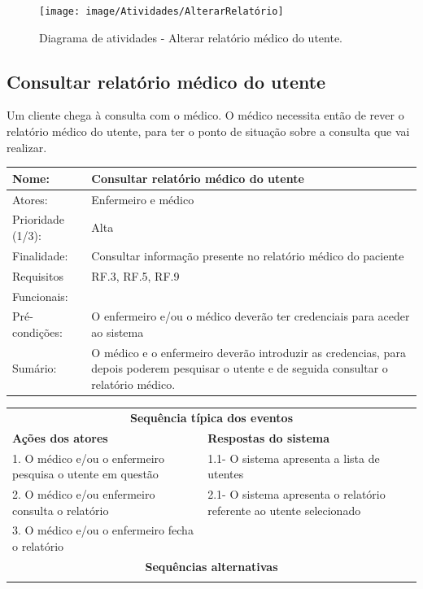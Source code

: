 \documentclass[11pt,a4paper,twoside]{report}
\begin{document}
\begin{figure}[H]
	\centering
	\texttt{[image: image/Atividades/AlterarRelatório]}
	\caption{Diagrama de atividades - Alterar relatório médico do utente.}
	\label{fig:alterarrelatoriomedico}
\end{figure}


\subsection{Consultar relatório médico do utente }

Um cliente chega à consulta com o médico. O médico necessita então de rever o relatório médico do utente, para ter o ponto de situação sobre a consulta que vai realizar.

\begin{center}
	\begin{tabularx}{\textwidth}{|lX|}
		\hline
		\textbf{Nome}: & \textbf{Consultar relatório médico do utente } \\ \hline
		Atores: & Enfermeiro e médico    \\ \hline
		Prioridade (1/3): & Alta  \\ \hline
		Finalidade: & Consultar informação presente no relatório médico do paciente    \\ \hline
		Requisitos & RF.3, RF.5, RF.9      \\
		Funcionais: & \\
		Pré-condições: &  O enfermeiro e/ou o médico deverão ter credenciais para aceder ao sistema   \\
		Sumário: & O médico e o enfermeiro deverão introduzir as credencias, para depois poderem pesquisar o utente e de seguida consultar o relatório médico. \\
		\hline
	\end{tabularx}
	
	\begin{tabularx}{\textwidth}{|XX|}
		\hline
		\multicolumn{2}{|c|}{\textbf{Sequência típica dos eventos} }\\
		\textbf{Ações dos atores}  & \textbf{Respostas do sistema} \\
		1.     O médico e/ou o enfermeiro pesquisa o utente em questão   &   1.1-     O sistema apresenta a lista de utentes  \\
		2.      O médico e/ou enfermeiro consulta o relatório        & 2.1-     O sistema apresenta o relatório referente ao utente selecionado    \\
		3.          O médico e/ou o enfermeiro fecha o relatório      &   \\
		\hline
		\multicolumn{2}{|c|}{\textbf{Sequências alternativas } }\\
		\hline
		\multicolumn{2}{|l|}{  }\\
		\hline
	\end{tabularx}
	
\end{center}
\end{document}
